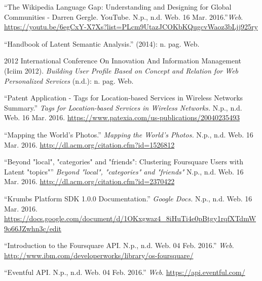 \documentclass[12pt,letterpaper]{article}
\begin{document}
\begin{thebibliography}{9}

	\enquote{The Wikipedia Language Gap: Understanding and Designing for Global Communities - Darren Gergle. YouTube. N.p., n.d. Web. 16 Mar. 2016.}\textit{Web}.	\href{https://youtu.be/6egCxY-X7Xs?list=PLcm9UtazJCOKbKQugcvWaoz3bLjj925ry}
	{\url{https://youtu.be/6egCxY-X7Xs?list=PLcm9UtazJCOKbKQugcvWaoz3bLjj925ry}}
	
	\enquote{Handbook of Latent Semantic Analysis.} (2014): n. pag. Web.
	
	2012 International Conference On Innovation And Information Management (Iciim 2012). \textit{Building User Profile Based on Concept and Relation for Web Personalized Services} (n.d.): n. pag. Web.
	
	\enquote{Patent Application - Tags for Location-based Services in Wireless Networks Summary.} 	  \textit{Tags for Location-based Services in Wireless Networks.} N.p., n.d. Web. 16 Mar. 2016. \href{https://www.patexia.com/us-publications/20040235493}{\url{https://www.patexia.com/us-publications/20040235493}}
	
	\enquote{Mapping the World's Photos.} \textit{Mapping the World's Photos.} N.p., n.d. Web. 16 Mar. 2016. \href{http://dl.acm.org/citation.cfm?id=1526812}{\url{http://dl.acm.org/citation.cfm?id=1526812}}
	
	\enquote{Beyond "local", "categories" and "friends": Clustering Foursquare Users with Latent "topics"} \textit{Beyond "local", "categories" and "friends"} N.p., n.d. Web. 16 Mar. 2016. \href{http://dl.acm.org/citation.cfm?id=2370422}{\url{http://dl.acm.org/citation.cfm?id=2370422}}
	
	\enquote{Krumbs Platform SDK 1.0.0 Documentation.} \textit{Google Docs.} N.p., n.d. Web. 16 Mar. 2016. \href{https://docs.google.com/document/d/1OKxgwaz4_8iHuTi4e0pBtgy1rqfXTdmW9o66JZwhn3c/edit}{\url{https://docs.google.com/document/d/1OKxgwaz4_8iHuTi4e0pBtgy1rqfXTdmW9o66JZwhn3c/edit}}
	
	\enquote{Introduction to the Foursquare API. N.p., n.d. Web. 04 Feb. 2016.} \textit{Web}. \href{http://www.ibm.com/developerworks/library/os-foursquare/}{\url{http://www.ibm.com/developerworks/library/os-foursquare/}}

	\enquote{Eventful API. N.p., n.d. Web. 04 Feb. 2016.} \textit{Web}. \href{https://api.eventful.com/}{\url{https://api.eventful.com/}}
	

\end{thebibliography}
\end{document}
